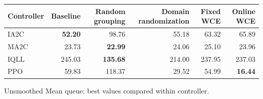 \begin{tabular}{lrrrrr}
\hline
Controller & Baseline & Random grouping & Domain randomization & Fixed WCE & Online WCE \\
\hline
IA2C & \textbf{52.20} & 98.76 & 55.18 & 63.32 & 65.89 \\
MA2C & 23.73 & \textbf{22.99} & 24.06 & 25.10 & 23.96 \\
IQLL & 245.03 & \textbf{135.68} & 214.00 & 237.95 & 237.03 \\
PPO & 59.83 & 118.37 & 29.52 & 54.99 & \textbf{16.44} \\
\hline
\end{tabular}
Unsmoothed Mean queue; best values compared within controller.
